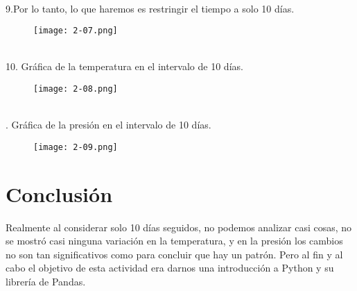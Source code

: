 \documentclass{article}
\begin{document}
\\
9.Por lo tanto, lo que haremos es restringir el tiempo a solo 10 días.\\
\begin{figure}[h]
  \texttt{[image: 2-07.png]}
\end{figure}
\\
10. Gráfica de la temperatura en el intervalo de 10 días.
\begin{figure}[h]
  \texttt{[image: 2-08.png]}
\end{figure}
\\
. Gráfica de la presión en el intervalo de 10 días.
\begin{figure}[h]
  \texttt{[image: 2-09.png]}
\end{figure}

\section{Conclusión}
Realmente al considerar solo 10 días seguidos, no podemos analizar casi cosas, no se mostró casi ninguna variación en la temperatura, y en la presión los cambios no son tan significativos como para concluir que hay un patrón. Pero al fin y al cabo el objetivo de esta actividad era darnos una introducción a Python y su librería de Pandas.
\end{document}
